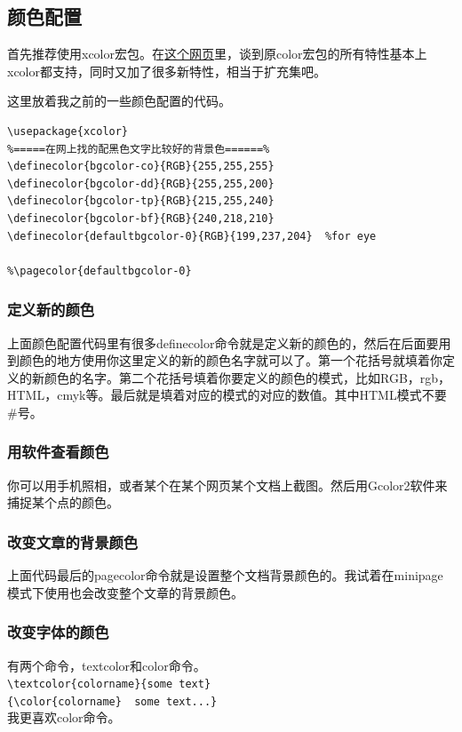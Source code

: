 \documentclass[12pt,oneside]{book}
\begin{document}
\begin{common-format}
\subsection{颜色配置}
首先推荐使用xcolor宏包。在\href{http://tex.stackexchange.com/questions/89763/when-to-use-the-xcolor-package-instead-of-the-color-package}{这个网页}里，谈到原color宏包的所有特性基本上xcolor都支持，同时又加了很多新特性，相当于扩充集吧。

这里放着我之前的一些颜色配置的代码。
\begin{Verbatim}
\usepackage{xcolor}  
%=====在网上找的配黑色文字比较好的背景色======%
\definecolor{bgcolor-co}{RGB}{255,255,255}  
\definecolor{bgcolor-dd}{RGB}{255,255,200}  
\definecolor{bgcolor-tp}{RGB}{215,255,240}  
\definecolor{bgcolor-bf}{RGB}{240,218,210}  
\definecolor{defaultbgcolor-0}{RGB}{199,237,204}  %for eye

%\pagecolor{defaultbgcolor-0}
\end{Verbatim}


\subsubsection{定义新的颜色}
上面颜色配置代码里有很多definecolor命令就是定义新的颜色的，然后在后面要用到颜色的地方使用你这里定义的新的颜色名字就可以了。第一个花括号就填着你定义的新颜色的名字。第二个花括号填着你要定义的颜色的模式，比如RGB，rgb，HTML，cmyk等。最后就是填着对应的模式的对应的数值。其中HTML模式不要\#号。

\subsubsection{用软件查看颜色}
你可以用手机照相，或者某个在某个网页某个文档上截图。然后用Gcolor2软件来捕捉某个点的颜色。

\subsubsection{改变文章的背景颜色}
上面代码最后的pagecolor命令就是设置整个文档背景颜色的。我试着在minipage模式下使用也会改变整个文章的背景颜色。


\subsubsection{改变字体的颜色}
有两个命令，textcolor和color命令。\\
\verb+\textcolor{colorname}{some text}+\\
\verb+{\color{colorname}  some text...}+\\
我更喜欢color命令。



\end{common-format}
\end{document}
